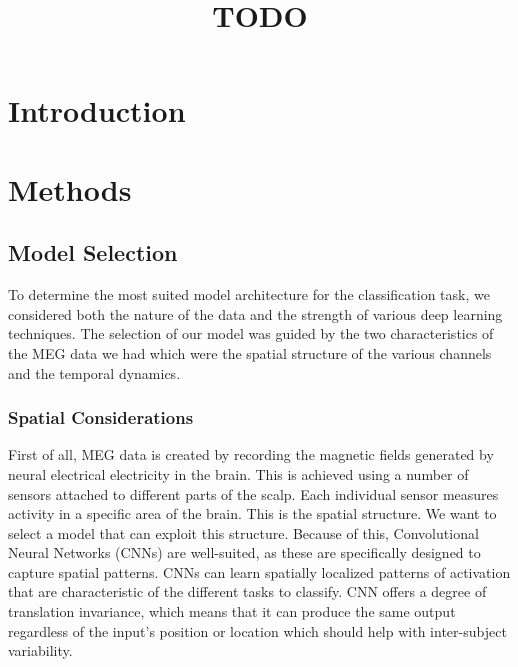 \documentclass[conference]{IEEEtran}
\begin{document}
\title{TODO}

\author{
}

\maketitle

\begin{abstract}
\end{abstract}

\section{Introduction}


\section{Methods}

\subsection{Model Selection}
To determine the most suited model architecture for the classification task, we considered both the nature of the data and the strength of various deep learning techniques. The selection of our model was guided by the two characteristics of the MEG data we had which were the spatial structure of the various channels and the temporal dynamics.

\subsubsection{Spatial Considerations}
First of all, MEG data is created by recording the magnetic fields generated by neural electrical electricity in the brain. This is achieved using a number of sensors attached to different parts of the scalp. Each individual sensor measures activity in a specific area of the brain. This is the spatial structure. We want to select a model that can exploit this structure. Because of this, Convolutional Neural Networks (CNNs) are well-suited, as these are specifically designed to capture spatial patterns. CNNs can learn spatially localized patterns of activation that are characteristic of the different tasks to classify. CNN offers a degree of translation invariance, which means that it can produce the same output regardless of the input's position or location which should help with inter-subject variability. 
\end{document}
